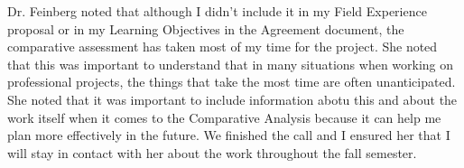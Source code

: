 \documentclass{article}
\begin{document}

Dr. Feinberg noted that although I didn't include it in my Field Experience proposal or in my Learning Objectives in the Agreement document, the comparative assessment has taken most of my time for the project. She noted that this was important to understand that in many situations when working on professional projects, the things that take the most time are often unanticipated. She noted that it was important to include information abotu this and about the work itself when it comes to the Comparative Analysis because it can help me plan more effectively in the future. We finished the call and I ensured her that I will stay in contact with her about the work throughout the fall semester.
\end{document}

